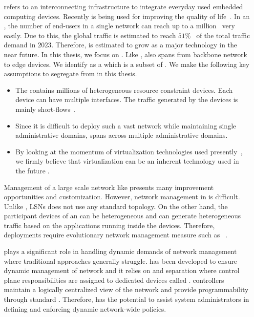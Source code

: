  refers to an interconnecting infrastructure to integrate everyday used embedded computing devices. Recently  is being used for improving the quality of life~\cite{NOUR201995}. In an , the number of end-users in a single network can reach up to a million~\cite{iotdeployment} very easily.  Due to this, the global  traffic is estimated to reach $51\%$~\cite{ipassonline} of the total traffic demand in $2023$. Therefore,  is estimated to grow as a major technology in the near future. In this thesis, we focus on . Like ,  also spans from backbone network to edge devices. We identify  as a  which is a subset of . We make the following key assumptions to segregate  from  in this thesis.
\begin{itemize}
\item The  contains millions of heterogeneous resource constraint  devices. Each device can have multiple interfaces. The traffic generated by the  devices is mainly short-flows~\cite{6560419}.
\item Since it is difficult to deploy such a vast network while maintaining single administrative domains,  spans across multiple administrative domains.
\item By looking at the momentum of virtualization technologies used presently~\cite{10.1145/3341302.3342075}, we firmly believe that virtualization can be an inherent technology used in the future .
\end{itemize}

Management of a large scale network like  presents many improvement opportunities and customization. However, network management in  is difficult. Unlike , \acp{LSN} does not use any standard topology. On the other hand, the participant devices of an  can be heterogeneous and can generate heterogeneous traffic based on the applications running inside the devices. Therefore,  deployments require evolutionary network management measure such as ~\cite{mckeown2008openflow,feamster2014road,nunes2014survey,caesar2005design}.

 plays a significant role in handling dynamic demands of network management~\cite{clark:1988:dpd:52325.52336} where traditional approaches generally struggle.  has been developed to ensure dynamic management of network and it relies on  and  separation where control plane responsibilities are assigned to dedicated devices called .  controllers maintain a logically centralized view of the network and provide programmability through standard . Therefore,  has the potential to assist system administrators in defining and enforcing dynamic network-wide policies.

